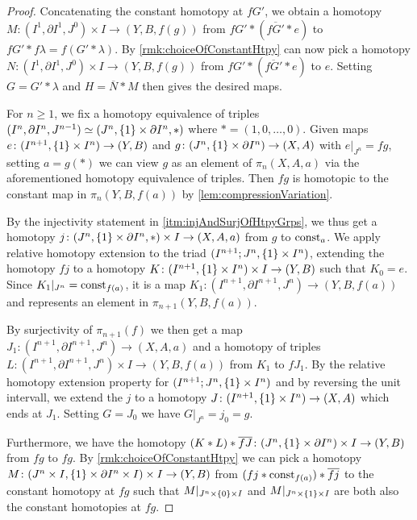 \begin{prop}
\begin{proof}
        Concatenating the constant homotopy at $fG'$, we obtain a homotopy $M\colon(I^1,\partial I^1,J^0)\times I\to (Y,B,f(g))$ from $fG'*(\overline{fG'}*e)$ to $fG'*f\lambda=f(G'*\lambda)$.
        By \cref{rmk:choiceOfConstantHtpy} can now pick a homotopy $N\colon(I^1,\partial I^1,J^0)\times I\to(Y,B,f(g))$ from $fG'*(\overline{fG'}*e)$ to $e$. 
        Setting $G=G'*\lambda$ and $H=\overline{N}*M$ then gives the desired maps.

        For $n\geq 1$, we fix a homotopy equivalence of triples $(I^n,\partial I^n, J^{n-1})\simeq (J^n,\left\lbrace1\right\rbrace\times\partial I^n,*)$ where $*=(1,0,\ldots,0)$.
        Given maps $e\colon(I^{n+1},\left\lbrace1\right\rbrace\times I^n)\to (Y,B)$ and $g\colon(J^n,\left\lbrace1\right\rbrace\times\partial I^n)\to(X,A)$ with $e|_{J^n}=fg$, setting $a=g(*)$ we can view $g$ as an element of $\pi_n(X,A,a)$ via the aforementioned homotopy equivalence of triples.
        Then $fg$ is homotopic to the constant map in $\pi_n(Y,B,f(a))$ by \cref{lem:compressionVariation}.

        By the injectivity statement in \ref{itm:injAndSurjOfHtpyGrps}, we thus get a homotopy $j\colon(J^n,\left\lbrace1\right\rbrace\times\partial I^n,*)\times I\to(X,A,a)$ from $g$ to $\operatorname{const}_a$.
        We apply relative homotopy extension to the triad $(I^{n+1};J^n,\left\lbrace1\right\rbrace\times I^n)$, extending the homotopy $fj$ to a homotopy $K\colon(I^{n+1},\left\lbrace1\right\rbrace\times I^n)\times I\to(Y,B)$ such that $K_0=e$.
        Since $K_1|_{J^n}=\operatorname{const}_{f(a)}$, it is a map $K_1\colon(I^{n+1},\partial I^{n+1},J^n)\to(Y,B,f(a))$ and represents an element in $\pi_{n+1}(Y,B,f(a))$.
        
        By surjectivity of $\pi_{n+1}(f)$ we then get a map $J_1\colon(I^{n+1},\partial I^{n+1},J^n)\to(X,A,a)$ and a homotopy of triples $L\colon(I^{n+1},\partial I^{n+1},J^n)\times I\to(Y,B,f(a))$ from $K_1$ to $fJ_1$.
        By the relative homotopy extension property for $(I^{n+1};J^n,\left\lbrace1\right\rbrace\times I^n)$ and by reversing the unit intervall, we extend the $j$ to a homotopy $J\colon(I^{n+1},\left\lbrace1\right\rbrace\times I^n)\to(X,A)$ which ends at $J_1$.
        Setting $G=J_0$ we have $G|_{J^n}=j_0=g$.

        Furthermore, we have the homotopy $(K*L)*\overline{fJ}\colon(J^n,\left\lbrace1\right\rbrace\times\partial I^n)\times I\to(Y,B)$ from $fg$ to $fg$.
        By \cref{rmk:choiceOfConstantHtpy} we can pick a homotopy $M\colon(J^n\times I,\left\lbrace1\right\rbrace\times\partial I^n\times I)\times I\to(Y,B)$ from $(fj*\operatorname{const}_{f(a)})*\overline{fj}$ to the constant homotopy at $fg$ such that $M|_{J^n\times\left\lbrace0\right\rbrace\times I}$ and $M|_{J^n\times\left\lbrace1\right\rbrace\times I}$ are both also the constant homotopies at $fg$.
        

\end{proof}
\end{prop}
